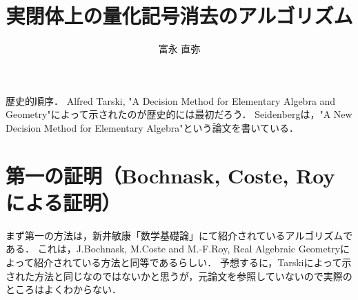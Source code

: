 \documentclass[uplatex, dvipdfmx]{jsarticle}
\theoremstyle{definition}
\begin{document}
\title{実閉体上の量化記号消去のアルゴリズム}
\author{富永 直弥}
\maketitle

歴史的順序．
Alfred Tarski, "A Decision Method for Elementary Algebra and Geometry"によって示されたのが歴史的には最初だろう．
Seidenbergは，"A New Decision Method for Elementary Algebra"という論文を書いている．


\section{第一の証明（Bochnask, Coste, Royによる証明）}
まず第一の方法は，新井敏康「数学基礎論」にて紹介されているアルゴリズムである．
これは，J.Bochnask, M.Coste and M.-F.Roy, Real Algebraic Geometryによって紹介されている方法と同等であるらしい．
予想するに，Tarskiによって示された方法と同じなのではないかと思うが，元論文を参照していないので実際のところはよくわからない．
\end{document}

